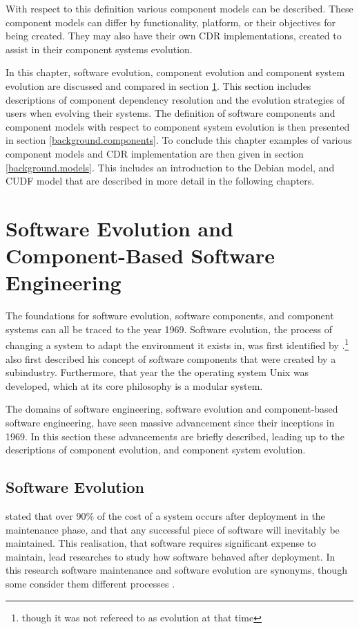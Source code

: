 With respect to this definition various component models can be described.
These component models can differ by functionality, platform, or their objectives for being created.
They may also have their own CDR implementations, created to assist in their component systems evolution. 

In this chapter, software evolution, component evolution and component system evolution are discussed and compared in section \ref{background.evolution}.
This section includes descriptions of component dependency resolution and the evolution strategies of users when evolving their systems.
The definition of software components and component models with respect to component system evolution is then presented in section \ref{background.components}.
To conclude this chapter  examples of various component models and CDR implementation are then given in section \ref{background.models}.
This includes an introduction to the Debian model, and CUDF model that are described in more detail in the following chapters.

\section{Software Evolution and Component-Based Software Engineering}
\label{background.evolution}
The foundations for software evolution, software components, and component systems can all be traced to the year 1969.
Software evolution, the process of changing a system to adapt the environment it exists in, 
was first identified by \cite{Lehman1969}.\footnote{though it was not refereed to as evolution at that time}
\cite{McIlroy1969} also first described his concept of software components that were created by a subindustry.
Furthermore, that year the the operating system Unix \citep{raymond2003art} was developed, which at its core philosophy is a modular system.

The domains of software engineering, software evolution and component-based software engineering, have seen massive advancement since their inceptions in 1969.
In this section these advancements are briefly described, leading up to the descriptions of component evolution, and component system evolution.

\subsection{Software Evolution}
\cite{Brooks1975} stated that over 90\% of the cost of a system occurs after deployment in the maintenance phase,
and that any successful piece of software will inevitably be maintained.
This realisation, that software requires significant expense to maintain, lead researches to study how software behaved after deployment.
In this research software maintenance and software evolution are synonyms, though some consider them different processes \citep{Lehman2006,Godfrey2008}.

